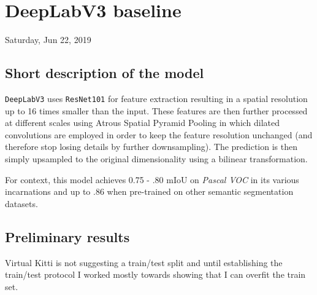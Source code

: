 \documentclass[10pt,a4paper]{article} %
\newcommand{\labday}[2]{\section{#2} \begin{flushright}#1\end{flushright}\bigskip}
\begin{document}
\pagestyle{plain}
\title{\rmfamily\normalfont{}}
\author{}
\date{} %

\maketitle
\begin{abstract}
   \noindent
   This document should work as a lab notebook of sorts containing expositions
   of the ideas being tested, experimental results and their interpretation.
\end{abstract}





\labday{Saturday, Jun 22, 2019}{DeepLabV3 baseline}
\label{sec:bal}


\subsection{Short description of the model}

\texttt{DeepLabV3} \cite{chen2017rethinking} uses \texttt{ResNet101} for
feature extraction resulting in a spatial resolution up to 16 times smaller
than the input. These features are then further processed at different scales
using Atrous Spatial Pyramid Pooling in which dilated convolutions are
employed in order to keep the feature resolution unchanged (and therefore
stop losing details by further downsampling). The prediction is then simply
upsampled to the original dimensionality using a bilinear transformation.

For context, this model achieves 0.75 - .80 mIoU on \textit{Pascal VOC} in
its various incarnations and up to .86 when pre-trained on other semantic
segmentation datasets.


\subsection{Preliminary results}
\label{sub:preliminary_results}

Virtual Kitti \cite{gaidon2016virtual} is not suggesting a train/test split
and until establishing the train/test protocol I worked mostly towards
showing that I can overfit the train set.
\end{document}
